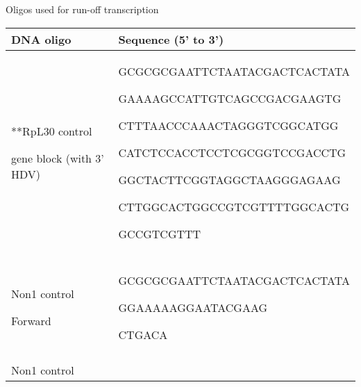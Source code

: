 \documentclass[12pt,oneside]{reedthesis}
\begin{document}
Oligos used for run-off transcription
\textbf{\\
}
\begin{longtable}[]{@{}ll@{}}
\toprule
\begin{minipage}[b]{0.42\columnwidth}\raggedright
\textbf{DNA oligo}\strut
\end{minipage} & \begin{minipage}[b]{0.51\columnwidth}\raggedright
\textbf{Sequence (5' to 3')}\strut
\end{minipage}\tabularnewline
\midrule
\endhead
\begin{minipage}[t]{0.42\columnwidth}\raggedright
**RpL30 control

gene block (with 3' HDV)\strut
\end{minipage} & \begin{minipage}[t]{0.51\columnwidth}\raggedright
GCGCGCGAATTCTAATACGACTCACTATA

{GAAAAGCCATTGTCAGCCGACGAAGTG}

{CTTTAACCCAAACTA}GGGTCGGCATGG

CATCTCCACCTCCTCGCGGTCCGACCTG

GGCTACTTCGGTAGGCTAAGGGAGAAG

CTTGGCACTGGCCGTCGTTTTGGCACTG

GCCGTCGTTT\strut
\end{minipage}\tabularnewline
\begin{minipage}[t]{0.42\columnwidth}\raggedright
\strut
\end{minipage} & \begin{minipage}[t]{0.51\columnwidth}\raggedright
\strut
\end{minipage}\tabularnewline
\begin{minipage}[t]{0.42\columnwidth}\raggedright
Non1 control

Forward\strut
\end{minipage} & \begin{minipage}[t]{0.51\columnwidth}\raggedright
GCGCGCGAATTCTAATACGACTCACTATA

{GGAAAAAGGAATACGAAG}

{CTGACA}\strut
\end{minipage}\tabularnewline
\begin{minipage}[t]{0.42\columnwidth}\raggedright
\strut
\end{minipage} & \begin{minipage}[t]{0.51\columnwidth}\raggedright
\strut
\end{minipage}\tabularnewline
\begin{minipage}[t]{0.42\columnwidth}\raggedright
Non1 control


\end{minipage}
\end{longtable}
\end{document}
